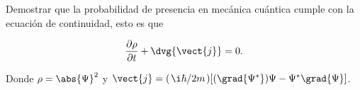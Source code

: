 \documentclass[./../main.tex]{subfiles}
\begin{document}
    \section{}
    
    Demostrar que la probabilidad de presencia en mecánica cuántica cumple con la ecuación de continuidad, esto es que

    \begin{equation*}
        \pdv{\rho}{t} + \dvg{\vect{j}} = 0.
    \end{equation*}

    Donde \(\rho = \abs{\Psi}^{2}\) y \(\vect{j} = (\slashfrac{\i \hbar}{2m})[(\grad{\Psi^{*}})\Psi - \Psi^{*}\grad{\Psi}]\).
\end{document}
